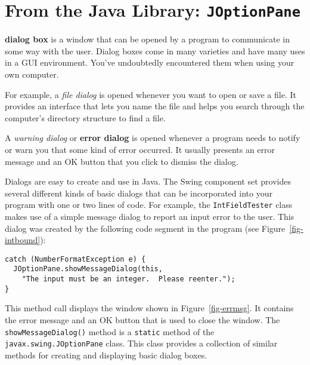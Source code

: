 \section{From the Java Library: {\tt JOptionPane}}
\label{sec-dialogs}\label{pg-sec-dialogs}

 {\bf dialog box} is a window that can be opened by a program to
communicate in some way with the user.   Dialog boxes come in many
varieties and have many uses in a GUI environment.  You've undoubtedly
encountered them when using your own computer.

For example, a {\it file dialog} is opened whenever you want to open
or save a file.  It provides an interface that lets you name the file
\WWWjava
and helps you search through the computer's directory structure to
find a file.


A {\it warning dialog} or {\bf error dialog} is opened whenever a
program needs to notify or warn you that some kind of error
occurred.  It usually presents an error message and an OK button that
you click to dismiss the dialog.


Dialogs are easy to create and use in Java.  The Swing component set
provides several different kinds of basic dialogs that can be
incorporated into your program with one or two lines of code.  For
example, the {\tt IntFieldTester} class makes use of a simple message
dialog to report an input error to the user.   This dialog was created
by the following code segment in the program (see
Figure~\ref{fig-intbound}):

\begin{jjjlisting}
\begin{lstlisting}
catch (NumberFormatException e) {
  JOptionPane.showMessageDialog(this,
    "The input must be an integer.  Please reenter.");
}
\end{lstlisting}
\end{jjjlisting}

\noindent This method call displays the window shown in
Figure~\ref{fig-errmsg}. It contains the error message and an
OK button that is used to close the window.  The
{\tt showMessageDialog()} method is a {\tt static} method of the
{\tt javax.swing.J\-OptionPane} class.  This class provides a
collection of similar methods for creating and displaying basic dialog
boxes.

